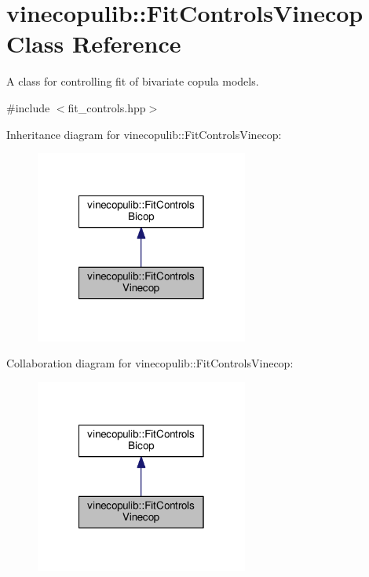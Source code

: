 \hypertarget{classvinecopulib_1_1_fit_controls_vinecop}{\section{vinecopulib\+:\+:Fit\+Controls\+Vinecop Class Reference}
\label{classvinecopulib_1_1_fit_controls_vinecop}
}


A class for controlling fit of bivariate copula models.  




{\ttfamily \#include $<$fit\+\_\+controls.\+hpp$>$}



Inheritance diagram for vinecopulib\+:\+:Fit\+Controls\+Vinecop\+:\nopagebreak
\begin{figure}[H]
\begin{center}
\leavevmode
\includegraphics[width=198pt]{classvinecopulib_1_1_fit_controls_vinecop__inherit__graph}
\end{center}
\end{figure}


Collaboration diagram for vinecopulib\+:\+:Fit\+Controls\+Vinecop\+:\nopagebreak
\begin{figure}[H]
\begin{center}
\leavevmode
\includegraphics[width=198pt]{classvinecopulib_1_1_fit_controls_vinecop__coll__graph}
\end{center}
\end{figure}
